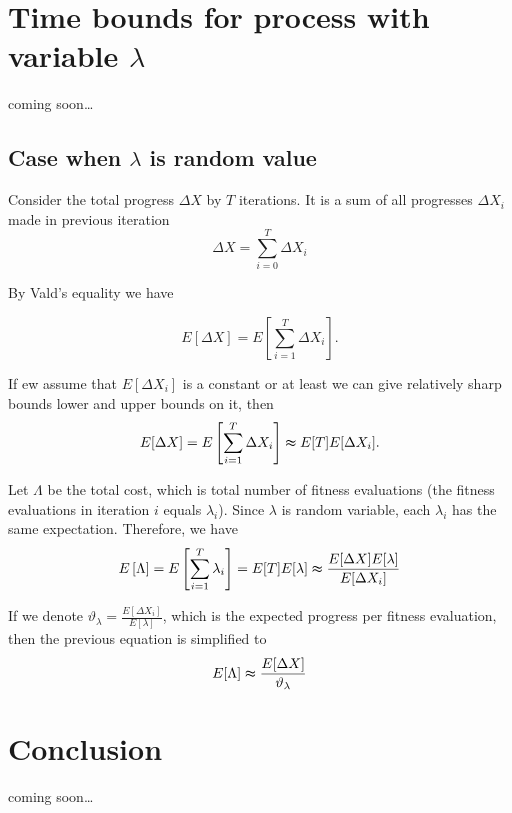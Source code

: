 \documentclass[12pt, a4paper]{article}
\theoremstyle{remark}
\newcommand{\cm}{coming soon\dots}
\begin{document}

\section{Time bounds for process with variable $\lambda$}
\cm
\subsection{Case when $\lambda$ is random value}
Consider the total progress $\Delta X$ by $T$ iterations. It is a sum of all progresses $\Delta X_i$ made in previous iteration
\[
    \Delta X = \sum_{i = 0}^{T} \Delta X_i
\]

By Vald's equality we have 

\[
    E[\Delta X] = E\left[\sum_{i = 1}^{T} \Delta X_i\right].      
\]

If ew assume that $E[\Delta X_i]$ is a constant or at least we can give relatively sharp bounds lower and upper bounds on it, then
\[
    E[\Delta X] = E\left[\sum_{i = 1}^{T} \Delta X_i\right] \thickapprox E[T] E[\Delta X_i].      
\]

Let $\Lambda$ be the total cost, which is total number of fitness evaluations (the fitness evaluations in iteration $i$ equals $\lambda_i$). Since $\lambda$ is random variable, each $\lambda_i$ has the same expectation. Therefore, we have
\[
    E\left[\Lambda\right] = E\left[\sum_{i = 1}^{T} \lambda_i\right] = E[T] E[\lambda] \thickapprox \frac{E[\Delta X] E[\lambda]}{E[\Delta X_i]}
\]

If we denote $\vartheta_\lambda = \frac{E[\Delta X_i]}{E[\lambda]}$, which is the expected progress per fitness evaluation, then the previous equation is simplified to
\[
        E[\Lambda] \thickapprox \frac{E[\Delta X]}{\vartheta_\lambda}
\]

\section{Conclusion}
\cm
\end{document}
